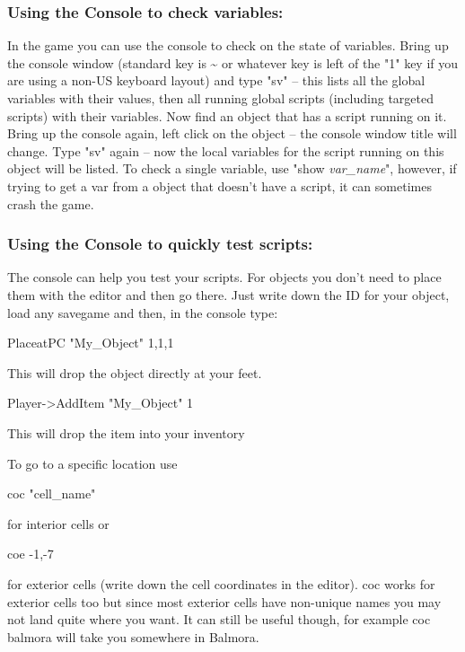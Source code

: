 \hypertarget{using-the-console-to-check-variables}{%
\subsubsection{Using the Console to check
variables:}\label{using-the-console-to-check-variables}}

In the game you can use the console to check on the state of variables.
Bring up the console window (standard key is \textasciitilde{} or
whatever key is left of the "1" key if you are using a non-US keyboard
layout) and type "sv" -- this lists all the global variables with their
values, then all running global scripts (including targeted scripts)
with their variables. Now find an object that has a script running on
it. Bring up the console again, left click on the object -- the console
window title will change. Type "sv" again -- now the local variables for
the script running on this object will be listed. To check a single
variable, use "show \emph{var\_name}", however, if trying to get a var
from a object that doesn't have a script, it can sometimes crash the
game.

\hypertarget{using-the-console-to-quickly-test-scripts}{%
\subsubsection{Using the Console to quickly test
scripts:}\label{using-the-console-to-quickly-test-scripts}}

The console can help you test your scripts. For objects you don't need
to place them with the editor and then go there. Just write down the ID
for your object, load any savegame and then, in the console type:

PlaceatPC "My\_Object" 1,1,1

This will drop the object directly at your feet.

Player-\textgreater AddItem "My\_Object" 1

This will drop the item into your inventory

To go to a specific location use

coc "cell\_name"

for interior cells or

coe -1,-7

for exterior cells (write down the cell coordinates in the editor). coc
works for exterior cells too but since most exterior cells have
non-unique names you may not land quite where you want. It can still be
useful though, for example coc balmora will take you somewhere in
Balmora.

